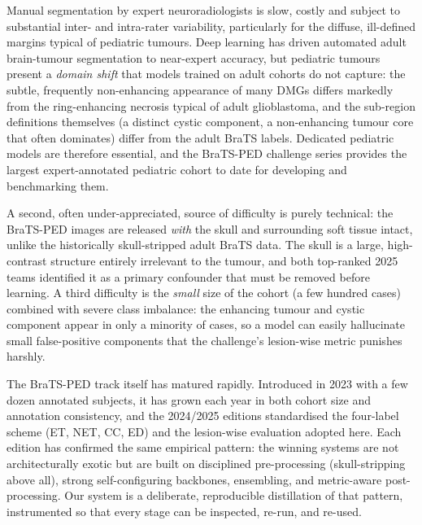 \documentclass[11pt,a4paper]{article}
\begin{document}
Manual segmentation by expert neuroradiologists is slow, costly and subject to
substantial inter- and intra-rater variability, particularly for the diffuse,
ill-defined margins typical of pediatric tumours. Deep learning has driven automated
adult brain-tumour segmentation to near-expert accuracy, but pediatric tumours
present a \emph{domain shift} that models trained on adult cohorts do not capture:
the subtle, frequently non-enhancing appearance of many DMGs differs markedly from
the ring-enhancing necrosis typical of adult glioblastoma, and the sub-region
definitions themselves (a distinct cystic component, a non-enhancing tumour core
that often dominates) differ from the adult BraTS labels. Dedicated pediatric models
are therefore essential, and the BraTS-PED challenge series provides the largest
expert-annotated pediatric cohort to date for developing and benchmarking them.

A second, often under-appreciated, source of difficulty is purely technical: the
BraTS-PED images are released \emph{with} the skull and surrounding soft tissue
intact, unlike the historically skull-stripped adult BraTS data. The skull is a
large, high-contrast structure entirely irrelevant to the tumour, and both top-ranked
2025 teams identified it as a primary confounder that must be removed before
learning. A third difficulty is the \emph{small} size of the cohort (a few hundred
cases) combined with severe class imbalance: the enhancing tumour and cystic
component appear in only a minority of cases, so a model can easily hallucinate small
false-positive components that the challenge's lesion-wise metric punishes harshly.

The BraTS-PED track itself has matured rapidly. Introduced in 2023 with a few dozen
annotated subjects, it has grown each year in both cohort size and annotation
consistency, and the 2024/2025 editions standardised the four-label scheme (ET, NET,
CC, ED) and the lesion-wise evaluation adopted here. Each edition has confirmed the
same empirical pattern: the winning systems are not architecturally exotic but are
built on disciplined pre-processing (skull-stripping above all), strong
self-configuring backbones, ensembling, and metric-aware post-processing. Our system
is a deliberate, reproducible distillation of that pattern, instrumented so that every
stage can be inspected, re-run, and re-used.
\end{document}
